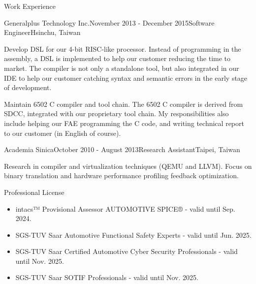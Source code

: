 \documentclass{resume} %
\begin{document}
\begin{rSection}{Work Experience}

\begin{rSubsection}{Generalplus Technology Inc.}{November 2013 - December 2015}{Software Engineer}{Hsinchu, Taiwan}
\item Develop DSL for our 4-bit RISC-like processor. Instead of programming in the assembly, a DSL is implemented to help our customer reducing the time to market. The compiler is not only a standalone tool, but also integrated in our IDE to help our customer catching syntax and semantic errors in the early stage of development.
\item Maintain 6502 C compiler and tool chain. The 6502 C compiler is derived from SDCC, integrated with our proprietary tool chain. My responsibilities also include helping our FAE programming the C code, and writing technical report to our customer (in English of course). 
\end{rSubsection}


\begin{rSubsection}{Academia Sinica}{October 2010 - August 2013}{Research Assistant}{Taipei, Taiwan}
\item Research in compiler and virtualization techniques (QEMU and LLVM). Focus on binary translation and hardware performance profiling feedback optimization.
\end{rSubsection}

\end{rSection}

\begin{rSection}{Professional License}

\begin{itemize}
\item intacs™ Provisional Assessor AUTOMOTIVE SPICE® - valid until Sep. 2024.
\item SGS-TUV Saar Automotive Functional Safety Experts - valid until Jun. 2025.
\item SGS-TUV Saar Certified Automotive Cyber Security Professionals - valid until Nov. 2025.
\item SGS-TUV Saar SOTIF Professionals - valid until Nov. 2025.
\end{itemize}

\end{rSection}
\end{document}
